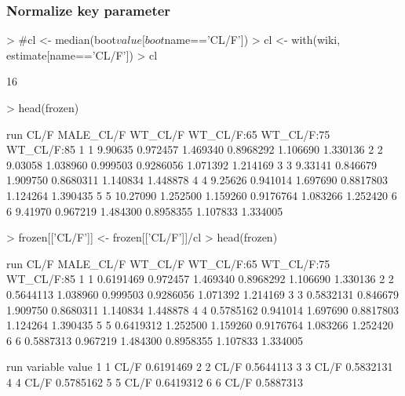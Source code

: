 \subsubsection{Normalize key parameter}
\begin{Schunk}
\begin{Sinput}
> #cl <- median(boot$value[boot$name=='CL/F'])
> cl <- with(wiki, estimate[name=='CL/F'])
> cl
\end{Sinput}
\begin{Soutput}
[1] 16
\end{Soutput}
\begin{Sinput}
> head(frozen)
\end{Sinput}
\begin{Soutput}
  run     CL/F MALE_CL/F  WT_CL/F WT_CL/F:65 WT_CL/F:75 WT_CL/F:85
1   1  9.90635  0.972457 1.469340  0.8968292   1.106690   1.330136
2   2  9.03058  1.038960 0.999503  0.9286056   1.071392   1.214169
3   3  9.33141  0.846679 1.909750  0.8680311   1.140834   1.448878
4   4  9.25626  0.941014 1.697690  0.8817803   1.124264   1.390435
5   5 10.27090  1.252500 1.159260  0.9176764   1.083266   1.252420
6   6  9.41970  0.967219 1.484300  0.8958355   1.107833   1.334005
\end{Soutput}
\begin{Sinput}
> frozen[['CL/F']] <- frozen[['CL/F']]/cl
> head(frozen)
\end{Sinput}
\begin{Soutput}
  run      CL/F MALE_CL/F  WT_CL/F WT_CL/F:65 WT_CL/F:75 WT_CL/F:85
1   1 0.6191469  0.972457 1.469340  0.8968292   1.106690   1.330136
2   2 0.5644113  1.038960 0.999503  0.9286056   1.071392   1.214169
3   3 0.5832131  0.846679 1.909750  0.8680311   1.140834   1.448878
4   4 0.5785162  0.941014 1.697690  0.8817803   1.124264   1.390435
5   5 0.6419312  1.252500 1.159260  0.9176764   1.083266   1.252420
6   6 0.5887313  0.967219 1.484300  0.8958355   1.107833   1.334005
\end{Soutput}
\begin{Soutput}
  run variable     value
1   1     CL/F 0.6191469
2   2     CL/F 0.5644113
3   3     CL/F 0.5832131
4   4     CL/F 0.5785162
5   5     CL/F 0.6419312
6   6     CL/F 0.5887313
\end{Soutput}
\end{Schunk}
